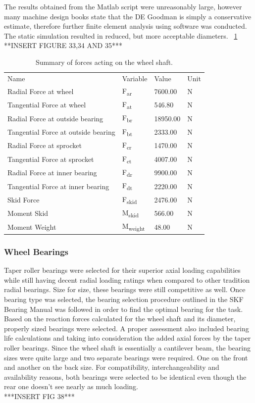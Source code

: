 The results obtained from the Matlab script were unreasonably large, however many machine design books state that the DE Goodman is simply a conservative estimate, therefore further finite element analysis using software was conducted. The static simulation resulted in reduced, but more acceptable diameters. 
~\ref {tab:shaft_calc}
\\
**INSERT FIGURE 33,34 AND 35***
\\
\begin{table}[htbp]
	\centering
	\caption{Summary of forces acting on the wheel shaft.}
	\begin{tabular}{| llll |} \hline
		Name & Variable & Value & Unit \\
		Radial Force at wheel & F\textsubscript{ar} & 7600.00 & N \\
		Tangential Force at wheel & F\textsubscript{at} & 546.80 & N \\
		Radial Force at outside bearing & F\textsubscript{br} & 18950.00 & N \\
		Tangential Force at outside bearing & F\textsubscript{bt} & 2333.00 & N \\
		Radial Force at sprocket & F\textsubscript{cr} & 1470.00 & N \\
		Tangential Force at sprocket & F\textsubscript{ct} & 4007.00 & N \\
		Radial Force at inner bearing & F\textsubscript{dr} & 9900.00 & N \\
		Tangential Force at inner bearing & F\textsubscript{dt} & 2220.00 & N \\
		Skid Force & F\textsubscript{skid} & 2476.00 & N \\
		Moment Skid & M\textsubscript{skid} & 566.00 & N \\
		Moment Weight & M\textsubscript{weight} & 48.00 & N \\
	\end{tabular}
	\label{tab:shaft_calc}
\end{table}


\subsubsection{Wheel Bearings}
Taper roller bearings were selected for their superior axial loading capabilities while still having decent radial loading ratings when compared to other tradition radial bearings. Size for size, these bearings were still competitive as well. Once bearing type was selected, the bearing selection procedure outlined in the SKF Bearing Manual was followed in order to find the optimal bearing for the task. Based on the reaction forces calculated for the wheel shaft and its diameter, properly sized bearings were selected. A proper assessment also included bearing life calculations and taking into consideration the added axial forces by the taper roller bearings. Since the wheel shaft is essentially a cantilever beam, the bearing sizes were quite large and two separate bearings were required. One on the front and another on the back size. For compatibility, interchangeability and availability reasons, both bearings were selected to be identical even though the rear one doesn't see nearly as much loading.
\\
***INSERT FIG 38***

